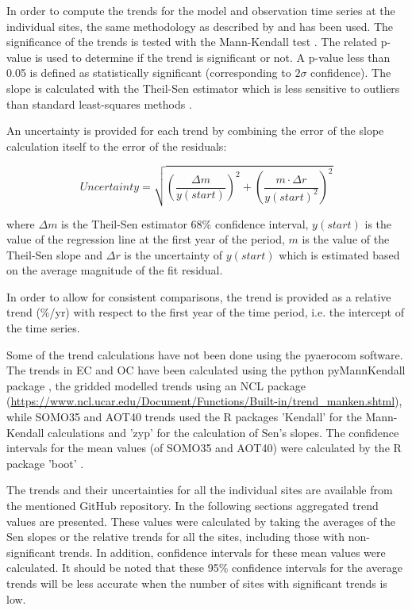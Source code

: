 In order to compute the trends for the model and observation time series at the individual sites, the same methodology as described by \citet{aas2019global} and \citet{mortier2020} has been used. The significance of the trends is tested with the Mann-Kendall test \citep{hamed1998modified}. The related p-value is used to determine if the trend is significant or not. A p-value less than 0.05 is defined as statistically significant (corresponding to $2\sigma$ confidence). The slope is calculated with the Theil-Sen estimator which is less sensitive to outliers than standard least-squares methods \citep{sen1968estimates}.

An uncertainty is provided for each trend by combining the error of the slope calculation itself to the error of the residuals:

\begin{equation}
 Uncertainty = \sqrt{{\left (\frac{\Delta m}{y(start)}\right )}^{2} + {\left ( \frac{m \cdot \Delta r}{y(start)^2}\right )}^{2} }
\end{equation}

where $\Delta m$ is the Theil-Sen estimator 68\% confidence interval, $y(start)$ is the value of the regression line at the first year of the period, $m$ is the value of the Theil-Sen slope and $\Delta r$ is the uncertainty of $y(start)$ which is estimated based on the average magnitude of the fit residual.


In order to allow for consistent comparisons, the trend is provided as a relative trend (\%/yr) with respect to the first year of the time period, i.e. the intercept of the time series.

Some of the trend calculations have not been done using the pyaerocom software. The trends in EC and OC have been calculated using the python pyMannKendall package \citep{Hussain2019}, the gridded modelled trends using an NCL package (\url{https://www.ncl.ucar.edu/Document/Functions/Built-in/trend_manken.shtml}), while SOMO35 and AOT40 trends used the R packages 'Kendall' \citep{McLeod_2011} for the Mann-Kendall calculations and 'zyp' \citep{Bronaugh_Werner_2019} for the calculation of Sen's slopes. The confidence intervals for the mean values (of SOMO35 and AOT40) were calculated by the R package 'boot' \citep{Canty_Ripley_2021}.

The trends and their uncertainties for all the individual sites are available from the mentioned GitHub repository. In the following sections aggregated trend values are presented. These values were calculated by taking the averages of the Sen slopes or the relative trends for all the sites, including those with non-significant trends. In addition, confidence intervals for these mean values were calculated. It should be noted that these 95\% confidence intervals for the average trends will be less accurate when the number of sites with significant trends is low. 


